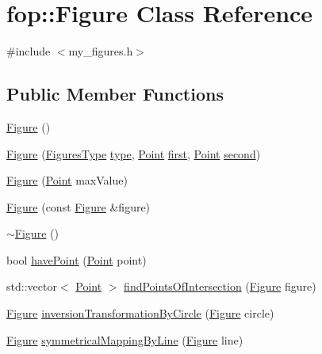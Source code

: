 \hypertarget{classfop_1_1_figure}{}\section{fop\+:\+:Figure Class Reference}
\label{classfop_1_1_figure}


{\ttfamily \#include $<$my\+\_\+figures.\+h$>$}

\subsection*{Public Member Functions}
\begin{DoxyCompactItemize}
\item 
\mbox{\hyperlink{classfop_1_1_figure_a624b2de787892723cbc48e67e847a2d6}{Figure}} ()
\item 
\mbox{\hyperlink{classfop_1_1_figure_af2154691492fa9cc825c7b4fc3224567}{Figure}} (\mbox{\hyperlink{namespacefop_a60dafe2e1ac5bb402dad57ecacde23d5}{Figures\+Type}} \mbox{\hyperlink{classfop_1_1_figure_ab3800215a1229d637bae3c24cfc59e08}{type}}, \mbox{\hyperlink{structtdp_1_1_point}{Point}} \mbox{\hyperlink{classfop_1_1_figure_afac8422d33b66489e3a7ddda4751d219}{first}}, \mbox{\hyperlink{structtdp_1_1_point}{Point}} \mbox{\hyperlink{classfop_1_1_figure_a10aa53d6dcfa427b06ebcf93ae6075b9}{second}})
\item 
\mbox{\hyperlink{classfop_1_1_figure_a2e24606aff7c6e923d3b1db4cb7f39df}{Figure}} (\mbox{\hyperlink{structtdp_1_1_point}{Point}} max\+Value)
\item 
\mbox{\hyperlink{classfop_1_1_figure_a2cc70342facf7064e5724651e351046b}{Figure}} (const \mbox{\hyperlink{classfop_1_1_figure}{Figure}} \&figure)
\item 
\mbox{\hyperlink{classfop_1_1_figure_ac17b0b902f9d4963f1b98b52e03e7953}{$\sim$\+Figure}} ()
\item 
bool \mbox{\hyperlink{classfop_1_1_figure_adaa195836173f677f9207c0b5f9c84fe}{have\+Point}} (\mbox{\hyperlink{structtdp_1_1_point}{Point}} point)
\item 
std\+::vector$<$ \mbox{\hyperlink{structtdp_1_1_point}{Point}} $>$ \mbox{\hyperlink{classfop_1_1_figure_a65bb58cd0c1cd84f8e8134d3118e760a}{find\+Points\+Of\+Intersection}} (\mbox{\hyperlink{classfop_1_1_figure}{Figure}} figure)
\item 
\mbox{\hyperlink{classfop_1_1_figure}{Figure}} \mbox{\hyperlink{classfop_1_1_figure_aae228e84324267f99ea7ece5067c94d9}{inversion\+Transformation\+By\+Circle}} (\mbox{\hyperlink{classfop_1_1_figure}{Figure}} circle)
\item 
\mbox{\hyperlink{classfop_1_1_figure}{Figure}} \mbox{\hyperlink{classfop_1_1_figure_a7f1666507e49eb3c2a79dc33ae49eb90}{symmetrical\+Mapping\+By\+Line}} (\mbox{\hyperlink{classfop_1_1_figure}{Figure}} line)
\end{DoxyCompactItemize}

